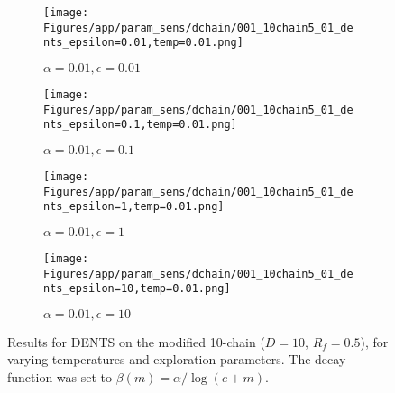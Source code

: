 \documentclass{article}
\theoremstyle{plain}
\begin{document}
\begin{appendices}
\begin{figure}
                \begin{subfigure}[b]{0.24\textwidth}
                    \centering
                    \texttt{[image: Figures/app/param\_sens/dchain/001\_10chain5\_01\_dents\_epsilon=0.01,temp=0.01.png]}
                    \caption*{$\alpha=0.01,\epsilon=0.01$}
                \end{subfigure}
                \begin{subfigure}[b]{0.24\textwidth}
                    \centering
                    \texttt{[image: Figures/app/param\_sens/dchain/001\_10chain5\_01\_dents\_epsilon=0.1,temp=0.01.png]}
                    \caption*{$\alpha=0.01,\epsilon=0.1$}
                \end{subfigure}
                \begin{subfigure}[b]{0.24\textwidth}
                    \centering
                    \texttt{[image: Figures/app/param\_sens/dchain/001\_10chain5\_01\_dents\_epsilon=1,temp=0.01.png]}
                    \caption*{$\alpha=0.01,\epsilon=1$}
                \end{subfigure}
                \begin{subfigure}[b]{0.24\textwidth}
                    \centering
                    \texttt{[image: Figures/app/param\_sens/dchain/001\_10chain5\_01\_dents\_epsilon=10,temp=0.01.png]}
                    \caption*{$\alpha=0.01,\epsilon=10$}
                \end{subfigure}
                
                \caption{Results for DENTS on the modified 10-chain ($D=10$, $R_f=0.5$), for varying temperatures and exploration parameters. The decay function was set to $\beta(m)=\alpha/\log(e+m)$.}
                \label{fig:dents_10chain_half_hps}
            \end{figure}


            \begin{figure}
                \centering
                

\end{figure}
\end{appendices}
\end{document}
